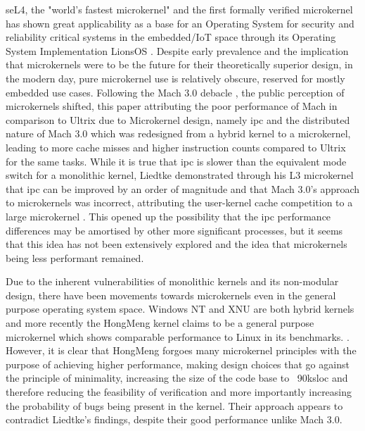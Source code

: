 \documentclass[../thesis.tex]{subfiles}
\begin{document}
seL4, the "world's fastest microkernel" \citep{Heiser_20:sel4wp} and the first formally verified microkernel \citep{Klein_AEHCDEEKNSTW_10} has shown great applicability as a base for an Operating System for security and reliability critical systems in the embedded/IoT space through its Operating System Implementation LionsOS \citep{Klein_AKMHF_18,Heiser_VCJGNLDZAZWPDB_25}.  
Despite early prevalence and the implication that microkernels were to be the future for their theoretically superior design, in the modern day, pure microkernel use is relatively obscure, reserved for mostly embedded use cases.
Following the Mach 3.0 debacle \citep{Chen_Bershad_93}, the public perception of microkernels shifted, this paper attributing the poor performance of Mach in comparison to Ultrix due to Microkernel design, namely \gls{ipc} and the distributed nature of Mach 3.0 which was redesigned from a hybrid kernel to a microkernel, leading to more cache misses and higher instruction counts compared to Ultrix for the same tasks. While it is true that \gls{ipc} is slower than the equivalent mode switch for a monolithic kernel, Liedtke demonstrated through his L3 microkernel that \gls{ipc} can be improved by an order of magnitude \citep{Liedtke_93} and that Mach 3.0's approach to microkernels was incorrect, attributing the user-kernel cache competition to a large microkernel \citep{Liedtke_96b}. This opened up the possibility that the \gls{ipc} performance differences may be amortised by other more significant processes, but it seems that this idea has not been extensively explored and the idea that microkernels being less performant remained.


Due to the inherent vulnerabilities of monolithic kernels and its non-modular design, there have been movements towards microkernels even in the general purpose operating system space. Windows NT and XNU are both hybrid kernels and more recently the HongMeng kernel claims to be a general purpose microkernel which shows comparable performance to Linux in its benchmarks. \citep{Chen_JWLLLWHLYWYPX_24}. However, it is clear that HongMeng forgoes many microkernel principles with the purpose of achieving higher performance, making design choices that go against the principle of minimality, increasing the size of the code base to ~90k\gls{sloc} and therefore reducing the feasibility of verification and more importantly increasing the probability of bugs being present in the kernel. Their approach appears to contradict Liedtke's findings, despite their good performance unlike Mach 3.0.
\end{document}

